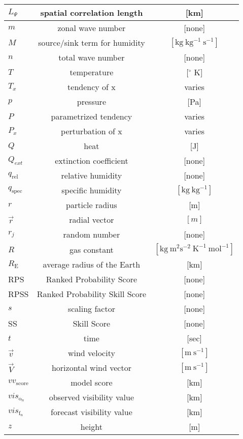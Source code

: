 \begin{longtable}[H]{|l|c|c|}
$L_{\Psi}$& spatial correlation length&[km]\\
\hline
$m$ &zonal wave number& [none]\\
\hline
$M$ &source/sink term for humidity& $\left[\mathrm{ kg \ kg^{-1} \ s^{-1} }\right]$\\
\hline
$n$ &total wave number& [none]\\
\hline
$T$ &temperature& [$^{\circ}$ K]\\
\hline
$T_{x}$ &tendency of  x & varies\\
\hline
$p$ & pressure & [Pa] \\
\hline
$P$ &parametrized tendency & varies\\
\hline
$P_{x}$ &perturbation of  x & varies\\
\hline
$Q$ &heat& [J]\\
\hline
$ Q_{ext}$&extinction coefficient& [none]\\
\hline
$q_{\mathrm{rel}}$ &relative humidity& [none]\\
\hline
$q_{\mathrm{spec}}$ &specific humidity&$\left[\mathrm{ kg \ kg^{-1} }\right]$\\
\hline
$r$ &particle radius& [m]\\
\hline
$\vec{r}$ & radial vector& $ [m]$\\
\hline
$r_{j}$ &random number& [none]\\
\hline
$R$ &gas constant& $ \left[\mathrm{ kg \ m^{2}s^{-2} \ K^{-1} \ mol^{-1}} \right]$\\
\hline
$R_{\mathrm{E}}$ &average radius of the Earth& [km]\\
\hline
RPS &Ranked Probability Score & [none] \\
\hline
RPSS &Ranked Probability Skill Score & [none] \\
\hline
$s$ &scaling factor & [none] \\
\hline
SS &Skill Score & [none] \\
\hline
$t$ &time & [sec] \\
\hline
$\vec{v}$ & wind velocity& $\left[\mathrm{ m \ s^{-1} }\right]$\\
\hline
$\vec{V}$ & horizontal wind vector& $\left[\mathrm{ m \ s^{-1} }\right]$\\
\hline
$vv_{\mathrm{score}}$ &model score &[km]\\
\hline
$vis_{\mathrm{o}_{n}}$ & observed visibility value& [km]\\
\hline
$vis_{\mathrm{f}_{n}}$ &forecast visibility value &[km]\\
\hline
$z$ & height &[m]\\

\end{longtable}
